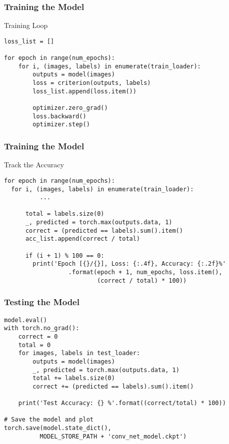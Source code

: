 \documentclass[14 pt]{beamer}
\begin{document}
\begin{frame}[fragile]
  \frametitle{Training the Model}
\footnotesize{
  \begin{block}{Training Loop}
\begin{verbatim}
loss_list = []

for epoch in range(num_epochs):
    for i, (images, labels) in enumerate(train_loader):
        outputs = model(images)
        loss = criterion(outputs, labels)
        loss_list.append(loss.item())

        optimizer.zero_grad()
        loss.backward()
        optimizer.step()
\end{verbatim}
  \end{block}
}
\end{frame}
\begin{frame}[fragile]
  \frametitle{Training the Model}
\footnotesize{
  \begin{block}{Track the Accuracy}
\begin{verbatim}
for epoch in range(num_epochs):
  for i, (images, labels) in enumerate(train_loader):
          ...

      total = labels.size(0)
      _, predicted = torch.max(outputs.data, 1)
      correct = (predicted == labels).sum().item()
      acc_list.append(correct / total)

      if (i + 1) % 100 == 0:
        print('Epoch [{}/{}], Loss: {:.4f}, Accuracy: {:.2f}%'
                  .format(epoch + 1, num_epochs, loss.item(),
                          (correct / total) * 100))
\end{verbatim}
  \end{block}
}
\end{frame}

\begin{frame}[fragile]
  \frametitle{Testing the Model}
\footnotesize{
  \begin{block}{}
\begin{verbatim}
model.eval()
with torch.no_grad():
    correct = 0
    total = 0
    for images, labels in test_loader:
        outputs = model(images)
        _, predicted = torch.max(outputs.data, 1)
        total += labels.size(0)
        correct += (predicted == labels).sum().item()

    print('Test Accuracy: {} %'.format((correct/total) * 100))

# Save the model and plot
torch.save(model.state_dict(), 
          MODEL_STORE_PATH + 'conv_net_model.ckpt')
\end{verbatim}
  \end{block}
}
\end{frame}
\end{document}
